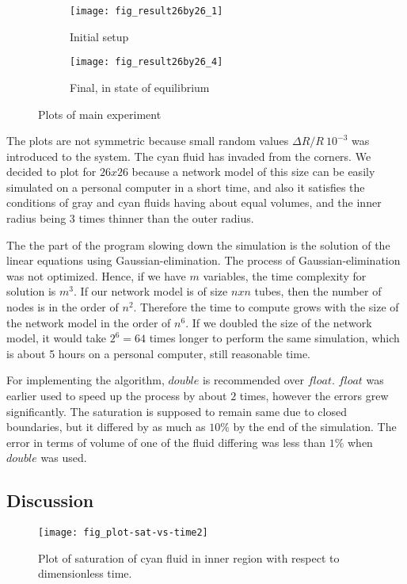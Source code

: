 	\begin{figure}[H]
		\centering
		\begin{subfigure}{0.46\textwidth}
			\centering
			\texttt{[image: fig\_result26by26\_1]}
			\caption{Initial setup}
		\end{subfigure}
		\begin{subfigure}{0.46\textwidth}
			\centering
			\texttt{[image: fig\_result26by26\_4]}
			\caption{Final, in state of equilibrium}
		\end{subfigure}
		\caption{Plots of main experiment}
	\end{figure}
	
	The plots are not symmetric because small random values $\Delta R / R ~ 10^{-3}$ was introduced to the system. The cyan fluid has invaded from the corners. We decided to plot for $26 x 26$ because a network model of this size can be easily simulated on a personal computer in a short time, and also it satisfies the conditions of gray and cyan fluids having about equal volumes, and the inner radius being 3 times thinner than the outer radius.
	
	The the part of the program slowing down the simulation is the solution of the linear equations using Gaussian-elimination. The process of Gaussian-elimination was not optimized. Hence, if we have $m$ variables, the time complexity for solution is $m^3$. If our network model is of size $n x n$ tubes, then the number of nodes is in the order of $n^2$. Therefore the time to compute grows with the size of the network model in the order of $n^6$. If we doubled the size of the network model, it would take $2^6 = 64$ times longer to perform the same simulation, which is about 5 hours on a personal computer, still reasonable time.
	
	For implementing the algorithm, $double$ is recommended over $float$. $float$ was earlier used to speed up the process by about $2$ times, however the errors grew significantly. The saturation is supposed to remain same due to closed boundaries, but it differed by as much as $10\%$ by the end of the simulation. The error in terms of volume of one of the fluid differing was less than $1\%$ when $double$ was used.
	
\subsection{Discussion} \label{sec:exp-discussion}
	\begin{figure}[H]
		\centering
		\texttt{[image: fig\_plot-sat-vs-time2]}
		\caption{Plot of saturation of cyan fluid in inner region with respect to dimensionless time.}
	\end{figure}
	
